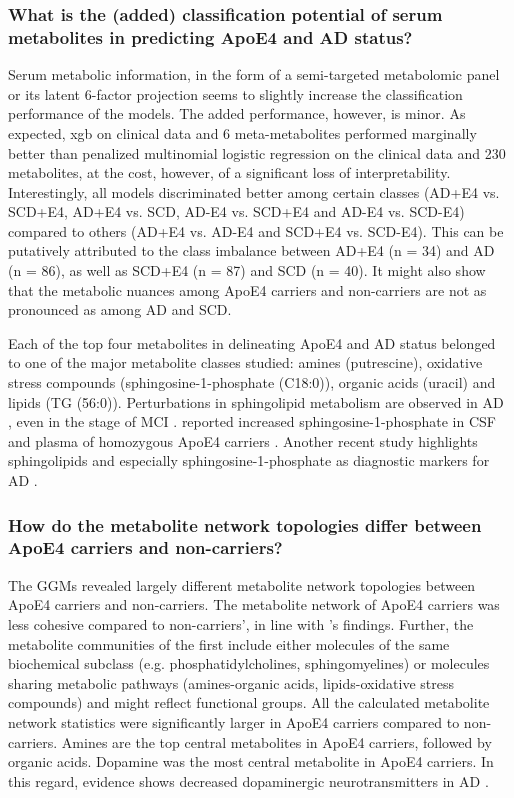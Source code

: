 \documentclass{amsart}
\begin{document}
\subsubsection{What is the (added) classification potential of serum metabolites in predicting ApoE4 and AD
status?}
Serum metabolic information, in the form of a semi-targeted metabolomic panel or its latent 6-factor projection seems to slightly increase the classification performance of the models. The added performance, however, is minor. As expected, \acrshort{xgb} on clinical data and 6 meta-metabolites performed marginally better than penalized multinomial logistic regression on the clinical data and 230 metabolites, at the cost, however, of a significant loss of interpretability. Interestingly, all models discriminated better among certain classes (AD+E4 vs. SCD+E4, AD+E4 vs. SCD, AD-E4 vs. SCD+E4 and AD-E4 vs. SCD-E4) compared to others (AD+E4 vs. AD-E4 and SCD+E4 vs. SCD-E4). This can be putatively attributed to the class imbalance between AD+E4 (n = 34) and AD (n = 86), as well as SCD+E4 (n = 87) and SCD (n = 40). It might also show that the metabolic nuances among ApoE4 carriers and non-carriers are not as pronounced as among AD and SCD.

Each of the top four metabolites in delineating ApoE4 and AD status belonged to one of the major metabolite classes studied: amines (putrescine), oxidative stress compounds (sphingosine-1-phosphate (C18:0)), organic acids (uracil) and lipids (TG (56:0)). Perturbations in sphingolipid metabolism are observed in AD \cite{mielke2010alterations}, even in the stage of MCI \cite{den2023sphingolipids}.  reported increased sphingosine-1-phosphate in CSF and plasma of homozygous ApoE4 carriers \cite{den2023sphingolipids}. Another recent study highlights sphingolipids and especially sphingosine-1-phosphate as diagnostic markers for AD \cite{d2022sphingolipid}.

\subsubsection{How do the metabolite network topologies differ between ApoE4 carriers and non-carriers?}
The GGMs revealed largely different metabolite network topologies between ApoE4 carriers and non-carriers. The metabolite network of ApoE4 carriers was less cohesive compared to non-carriers', in line with \citeauthor{deLeeuw2017Blood-basedDisease}'s findings. Further, the metabolite communities of the first include either molecules of the same biochemical subclass (e.g. phosphatidylcholines, sphingomyelines) or molecules sharing metabolic pathways (amines-organic acids, lipids-oxidative stress compounds) and might reflect functional groups. All the calculated metabolite network statistics were significantly larger in ApoE4 carriers compared to non-carriers. Amines are the top central metabolites in ApoE4 carriers, followed by organic acids. Dopamine was the most central metabolite in ApoE4 carriers. In this regard, evidence shows decreased dopaminergic neurotransmitters in AD \cite{shaikh2023targeting,pan2019dopamine}.
\end{document}
